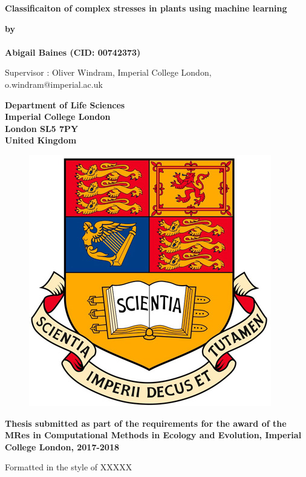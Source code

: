 \thispagestyle{empty}
\null\vskip0.2in%
\begin{center}
\LARGE{{\bf 
Classificaiton of complex stresses in plants using machine learning}}
\end{center}

\vspace{0.5cm}

\begin{center}
{\Large {\bf by}}\\
\mbox{} \\
{\Large {\bf Abigail Baines (CID: 00742373)}}

{\Large Supervisor : Oliver Windram, Imperial College London, o.windram@imperial.ac.uk}
\end{center}

\vspace{1cm}

\begin{center}
\large{\bf{Department of Life Sciences \\ Imperial College London \\
London SL5 7PY \\ United Kingdom}}
\end{center}


\vspace{1.5cm}

\begin{figure}[!h]
\centering
\includegraphics[scale=0.35]{imperial_crest_colour.jpg}
\end{figure}

\vspace{1.5cm}

\begin{center}
\large{\bf{Thesis submitted as part of the requirements for the award of the 
MRes in Computational Methods in Ecology and Evolution, Imperial College London, 2017-2018}} 
\vspace{0.5cm}
\large{\bf{

Formatted in the style of XXXXX}}

\end{center}

\vspace{2cm}

